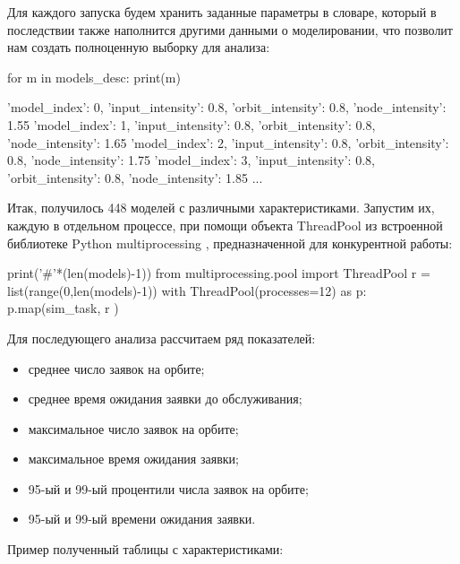 Для каждого запуска будем хранить заданные параметры в словаре, который в последствии также наполнится другими данными о моделировании, что позволит нам создать полноценную выборку для анализа:

\begin{pyin}
for m in models_desc:
   print(m)
\end{pyin}

\begin{pyprint}
{'model_index': 0, 'input_intensity': 0.8, 'orbit_intensity': 0.8, 'node_intensity': 1.55}
{'model_index': 1, 'input_intensity': 0.8, 'orbit_intensity': 0.8, 'node_intensity': 1.65}
{'model_index': 2, 'input_intensity': 0.8, 'orbit_intensity': 0.8, 'node_intensity': 1.75}
{'model_index': 3, 'input_intensity': 0.8, 'orbit_intensity': 0.8, 'node_intensity': 1.85}
...
\end{pyprint}

Итак, получилось 448 моделей с различными характеристиками. Запустим их, каждую в отдельном процессе, при помощи объекта ThreadPool из встроенной библиотеке Python multiprocessing \cite{multiproc}, предназначенной для конкурентной работы:
\begin{pyin}
print('#'*(len(models)-1))
from multiprocessing.pool import ThreadPool
r = list(range(0,len(models)-1))
with  ThreadPool(processes=12) as p:
   p.map(sim_task, r )
\end{pyin}

Для последующего анализа рассчитаем ряд показателей:
\begin{itemize}
	\item среднее число заявок на орбите;
	\item среднее время ожидания заявки до обслуживания;
	\item максимальное число заявок на орбите;
	\item максимальное время ожидания заявки;
	\item 95-ый и 99-ый процентили числа заявок на орбите;
	\item 95-ый и 99-ый времени ожидания заявки.
\end{itemize}

Пример полученный таблицы с характеристиками:

